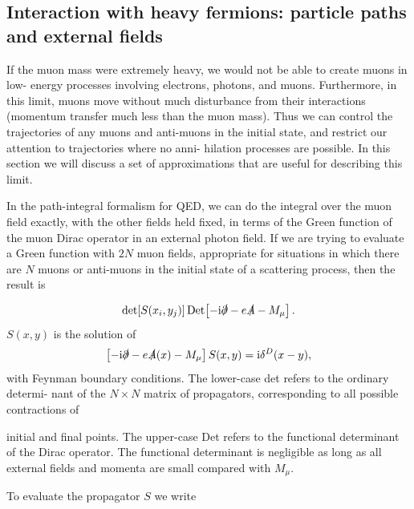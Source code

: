 \subsection{Interaction with heavy fermions: particle paths and external fields}

If the muon mass were extremely heavy, we would not be able to create muons in low-
energy processes involving electrons, photons, and muons. Furthermore, in this limit,
muons move without much disturbance from their interactions (momentum transfer
much less than the muon mass). Thus we can control the trajectories of any muons and
anti-muons in the initial state, and restrict our attention to trajectories where no anni-
hilation processes are possible. In this section we will discuss a set of approximations
that are useful for describing this limit.

In the path-integral formalism for QED, we can do the integral over the muon field
exactly, with the other fields held fixed, in terms of the Green function of the muon Dirac
operator in an external photon field. If we are trying to evaluate a Green function with
$2N$ muon fields, appropriate for situations in which there are $N$ muons or anti-muons
in the initial state of a scattering process, then the result is

\begin{equation}
  \det\!\left[S(x_i,y_j)\right]\operatorname{Det}\!\left[-\mathrm{i}\slashed\partial-e\slashed A-M_\mu\right].
  \label{eq:6.13}
\end{equation}
$S(x,y)$ is the solution of
\begin{equation*}
  \left[-\mathrm{i}\slashed\partial-e\slashed A(x)-M_\mu\right]S(x,y)
  =\mathrm{i}\delta^D(x-y),
\end{equation*}
with Feynman boundary conditions. The lower-case det refers to the ordinary determi-
nant of the $N\times N$ matrix of propagators, corresponding to all possible contractions of

initial and final points. The upper-case Det refers to the functional determinant of the
Dirac operator. The functional determinant is negligible as long as all external fields
and momenta are small compared with $M_\mu$.

To evaluate the propagator $S$ we write

